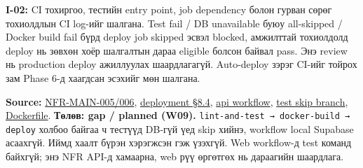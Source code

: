 \textbf{I-02:} CI тохиргоо, тестийн entry point, job dependency болон
гурван сөрөг тохиолдлын CI log-ийг шалгана. Test fail / DB unavailable
буюу all-skipped / Docker build fail бүрд deploy job skipped эсвэл
blocked, амжилттай тохиолдолд deploy нь зөвхөн хоёр шалгалтын дараа
eligible болсон байвал pass. Энэ review нь production deploy ажиллуулах
шаардлагагүй. Auto-deploy зэрэг CI-ийг тойрох зам Phase 6-д хаагдсан
эсэхийг мөн шалгана.

\textbf{Source:}
\href{../../phase-0/02-requirements.md}{NFR-MAIN-005/006},
\href{../../phase-0/09-deployment.md}{deployment §8.4},
\href{../../../.github/workflows/api-deploy.yml}{api workflow},
\href{../../../backend/api/tests/inquiry-cart.integration.test.ts}{test
skip branch}, \href{../../../backend/api/Dockerfile}{Dockerfile}.
\textbf{Төлөв: gap / planned (W09).}
\nolinkurl{lint-and-test → docker-build → deploy} холбоо байгаа ч
тестүүд DB-гүй үед skip хийнэ, workflow local Supabase асаахгүй. Иймд
хаалт бүрэн хэрэгжсэн гэж үзэхгүй. Web workflow-д test команд байхгүй;
энэ NFR API-д хамаарна, web рүү өргөтгөх нь дараагийн шаардлага.
